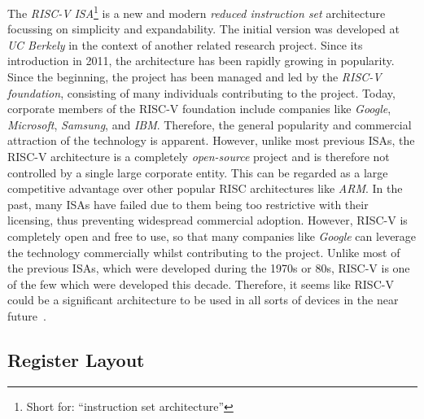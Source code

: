 The \emph{RISC-V} \emph{ISA}\footnote{Short for: \enquote{instruction set architecture}} is a new and modern \emph{reduced instruction set} architecture focussing on simplicity and expandability.
The initial version was developed at \emph{UC Berkely} in the context of another related research project.
Since its introduction in 2011, the architecture has been rapidly growing in popularity.
Since the beginning, the project has been managed and led by the \emph{RISC-V foundation}, consisting of many individuals contributing to the project.
Today, corporate members of the RISC-V foundation include companies like \emph{Google}, \emph{Microsoft}, \emph{Samsung}, and \emph{IBM}.
Therefore, the general popularity and commercial attraction of the technology is apparent.
However, unlike most previous ISAs, the RISC-V architecture is a completely \emph{open-source} project and is therefore not controlled by a single large corporate entity.
This can be regarded as a large competitive advantage over other popular RISC architectures like \emph{ARM}.
In the past, many ISAs have failed due to them being too restrictive with their licensing, thus preventing widespread commercial adoption.
However, RISC-V is completely open and free to use, so that many companies like \emph{Google} can leverage the technology commercially whilst contributing to the project.
Unlike most of the previous ISAs, which were developed during the 1970s or 80s, RISC-V is one of the few which were developed this decade.
Therefore, it seems like RISC-V could be a significant architecture to be used in all sorts of devices in the near future~\cite[preface]{Patterson2017}.

\subsection{Register Layout}

